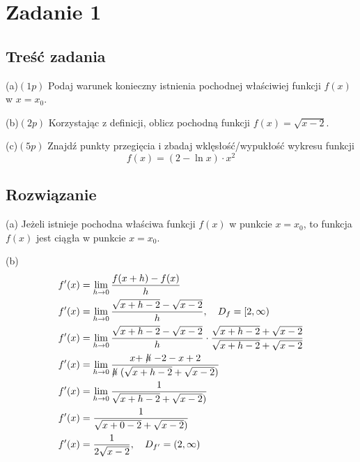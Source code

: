 \documentclass[12pt]{article}
\begin{document}
\section{Zadanie 1}
\subsection{Treść zadania}
(a)$(1p)$ Podaj warunek konieczny istnienia pochodnej właściwiej funkcji $f(x)$ w $x=x_0$.

(b)$(2p)$ Korzystając z definicji, oblicz pochodną funkcji $f(x) = \sqrt{x-2}$.

(c)$(5p)$ Znajdź punkty przegięcia i zbadaj wklęsłość/wypukłość wykresu funkcji 
\[f(x) = (2 - \ln x) \cdot x^2\]

\subsection{Rozwiązanie}
(a) Jeżeli istnieje pochodna właściwa funkcji $f(x)$ w punkcie $x=x_0$, to funkcja $f(x)$ jest ciągła w punkcie $x=x_0$.

(b)
\begin{align*}
    f'(x) &= \lim_{h\to0} \frac{f(x+h) - f(x)}{h} \\
    f'(x) &= \lim_{h\to0} \frac{\sqrt{x+h-2} - \sqrt{x-2}}{h}, \quad D_{f} = [2,\infty) \\
    f'(x) &= \lim_{h\to0} \frac{\sqrt{x+h-2} - \sqrt{x-2}}{h} \cdot \frac{\sqrt{x+h-2} + \sqrt{x-2}}{\sqrt{x+h-2} + \sqrt{x-2}} \\
    f'(x) &= \lim_{h\to0} \frac{x+\centernot{h}-2-x+2}{\centernot{h}(\sqrt{x+h-2} + \sqrt{x-2})} \\
    f'(x) &= \lim_{h\to0} \frac{1}{\sqrt{x+h-2} + \sqrt{x-2})} \\   
    f'(x) &= \frac{1}{\sqrt{x+0-2} + \sqrt{x-2})} \\    
    f'(x) &= \frac{1}{2\sqrt{x-2}}, \quad D_{f'} = (2,\infty)
\end{align*}
\end{document}
